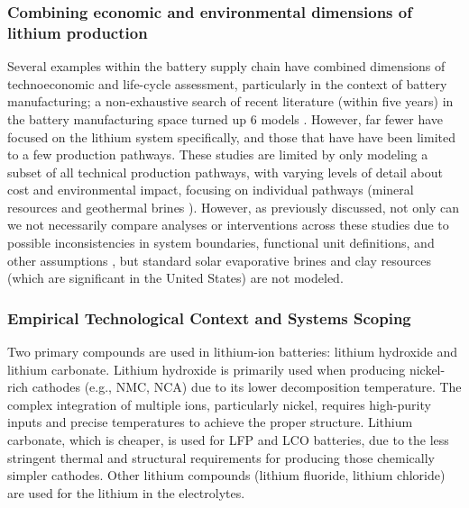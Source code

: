\documentclass{article}
\renewcommand\_{\textunderscore\allowbreak}
\begin{document}
\subsubsection{Combining economic and environmental dimensions of lithium production}\label{app:04-litreview-tealca}
Several examples within the battery supply chain have combined dimensions of technoeconomic and life-cycle assessment, particularly in the context of battery manufacturing; a non-exhaustive search of recent literature (within five years) in the battery manufacturing space turned up 6 models \cite{daiEverBattClosedloopBattery2019, chenTechnoeconomicAnalysisLithiumion2023, guvenLifecycleAssessmentLifecycle2023, gutschCostsCarbonFootprint2024, maPathwayDecisionsReuse2024, orangiBottomupFrameworkInvestigate2024}. However, far fewer have focused on the lithium system specifically, and those that have have been limited to a few production pathways. These studies are limited by only modeling a subset of all technical production pathways, with varying levels of detail about cost and environmental impact, focusing on individual pathways (mineral resources \cite{gaoLithiumExtractionHard2023, liRecoveryLithiumMineral2019} and geothermal brines \cite{huangLifeCycleAssessment2021}). However, as previously discussed, not only can we not necessarily compare analyses or interventions across these studies due to possible inconsistencies in system boundaries, functional unit definitions, and other assumptions \cite{bergersonLifeCycleAssessment2020}, but standard solar evaporative brines and clay resources (which are significant in the United States) are not modeled.

\subsubsection{Empirical Technological Context and Systems Scoping}\label{app:04-litreview-context}
Two primary compounds are used in lithium-ion batteries: lithium hydroxide and lithium carbonate. Lithium hydroxide is primarily used when producing nickel-rich cathodes (e.g., NMC, NCA) due to its lower decomposition temperature. The complex integration of multiple ions, particularly nickel, requires high-purity inputs and precise temperatures to achieve the proper structure. Lithium carbonate, which is cheaper, is used for LFP and LCO batteries, due to the less stringent thermal and structural requirements for producing those chemically simpler cathodes. Other lithium compounds (lithium fluoride, lithium chloride) are used for the lithium in the electrolytes.
\end{document}
